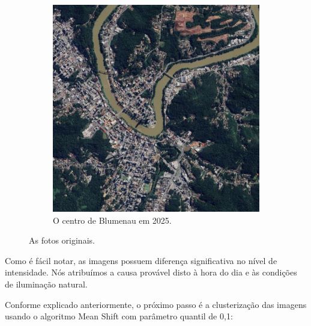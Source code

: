 \documentclass{article}
\begin{document}
\begin{figure}[H]
\begin{subfigure}[b]{0.48\textwidth}
        \includegraphics[width=\textwidth]{../Imagens/012025.png}
        \caption{O centro de Blumenau em 2025.}
        \label{2025}
    \end{subfigure}
    \caption{As fotos originais.}
    \label{original}
\end{figure}

Como é fácil notar, as imagens possuem diferença significativa no nível de intensidade. Nós atribuímos a causa provável disto à hora do dia e às condições de iluminação natural.

Conforme explicado anteriormente, o próximo passo é a clusterização das imagens usando o algoritmo Mean Shift com parâmetro quantil de 0,1:
\end{document}

